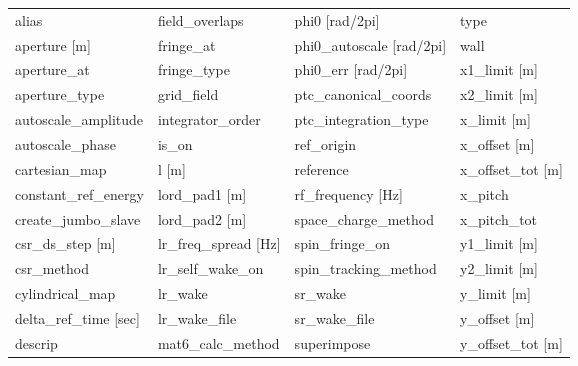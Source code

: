  \begin{tabular}{llll} \toprule
alias                            & field_overlaps                   & phi0 [rad/2pi]                   & type                             \\
aperture [m]                     & fringe_at                        & phi0_autoscale [rad/2pi]         & wall                             \\
aperture_at                      & fringe_type                      & phi0_err [rad/2pi]               & x1_limit [m]                     \\
aperture_type                    & grid_field                       & ptc_canonical_coords             & x2_limit [m]                     \\
autoscale_amplitude              & integrator_order                 & ptc_integration_type             & x_limit [m]                      \\
autoscale_phase                  & is_on                            & ref_origin                       & x_offset [m]                     \\
cartesian_map                    & l [m]                            & reference                        & x_offset_tot [m]                 \\
constant_ref_energy              & lord_pad1 [m]                    & rf_frequency [Hz]                & x_pitch                          \\
create_jumbo_slave               & lord_pad2 [m]                    & space_charge_method              & x_pitch_tot                      \\
csr_ds_step [m]                  & lr_freq_spread [Hz]              & spin_fringe_on                   & y1_limit [m]                     \\
csr_method                       & lr_self_wake_on                  & spin_tracking_method             & y2_limit [m]                     \\
cylindrical_map                  & lr_wake                          & sr_wake                          & y_limit [m]                      \\
delta_ref_time [sec]             & lr_wake_file                     & sr_wake_file                     & y_offset [m]                     \\
descrip                          & mat6_calc_method                 & superimpose                      & y_offset_tot [m]                 \\

\end{tabular}
